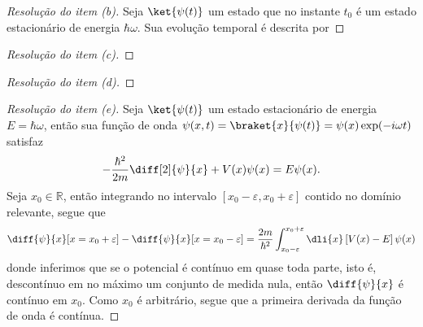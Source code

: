 \begin{proof}[Resolução do item (b)]
    Seja \(\ket{\psi(t)}\) um estado que no instante \(t_0\) é um estado estacionário de energia \(\hbar \omega\). Sua evolução temporal é descrita por
\end{proof}

\begin{proof}[Resolução do item (c)]

\end{proof}

\begin{proof}[Resolução do item (d)]

\end{proof}

\begin{proof}[Resolução do item (e)]
    Seja \(\ket{\psi(t)}\) um estado estacionário de energia \(E = \hbar \omega\), então sua função de onda \(\psi(x,t) = \braket{x}{\psi(t)} = \psi(x)\exp(-i\omega t)\) satisfaz
    \begin{equation*}
        -\frac{\hbar^2}{2m} \diff[2]{\psi}{x} + V(x)\psi(x) = E \psi(x).
    \end{equation*}
    Seja \(x_0 \in \mathbb{R}\), então integrando no intervalo \([x_0 - \varepsilon, x_0 + \varepsilon]\) contido no domínio relevante, segue que
    \begin{equation*}
        \diff{\psi}{x}[x = x_0 + \varepsilon] - \diff{\psi}{x}[x = x_0 - \varepsilon] = \frac{2m}{\hbar^2}\int_{x_0 - \varepsilon}^{x_0 + \varepsilon} \dli{x} \left[V(x) - E\right]\psi(x)
    \end{equation*}
    donde inferimos que se o potencial é contínuo em quase toda parte, isto é, descontínuo em no máximo um conjunto de medida nula, então \(\diff{\psi}{x}\) é contínuo em \(x_0\). Como \(x_0\) é arbitrário, segue que a primeira derivada da função de onda é contínua.
\end{proof}

